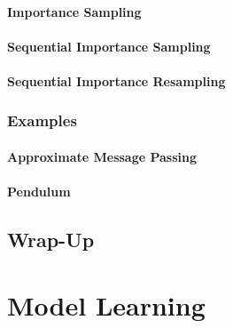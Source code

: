 			\subsubsection{Importance Sampling} %

			\subsubsection{Sequential Importance Sampling} %

			\subsubsection{Sequential Importance Resampling} %

		\subsection{Examples} %

			\subsubsection{Approximate Message Passing} %

			\subsubsection{Pendulum} %

	\section{Wrap-Up} %

\chapter{Model Learning}
	\label{c:modelLearning}


